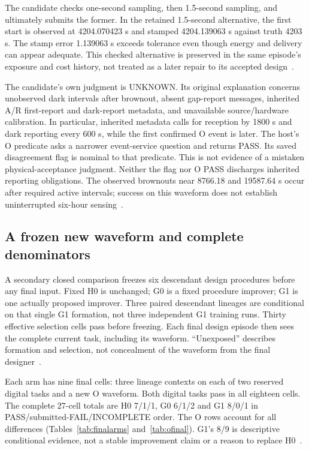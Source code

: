 

The candidate checks one-second sampling, then 1.5-second sampling,
and ultimately submits the former. In the retained 1.5-second
alternative, the first start is observed at 4204.070423 s and stamped
4204.139063 s against truth 4203 s. The stamp error 1.139063 s
exceeds tolerance even though energy and delivery can appear
adequate. This checked alternative is preserved in the same episode's
exposure and cost history, not treated as a later repair to its
accepted design~\cite{o0}.

The candidate's own judgment is UNKNOWN. Its original explanation
concerns unobserved dark intervals after brownout, absent gap-report
messages, inherited A/R first-report and dark-report metadata, and
unavailable source/hardware calibration. In particular, inherited
metadata calls for reception by 1800 s and dark reporting every
600 s, while the first confirmed O event is later. The host's O
predicate asks a narrower event-service question and returns PASS.
Its saved disagreement flag is nominal to that predicate. This is
not evidence of a mistaken physical-acceptance judgment. Neither
the flag nor O PASS discharges inherited reporting obligations.
The observed brownouts near 8766.18 and 19587.64 s occur after
required active intervals; success on this waveform does not
establish uninterrupted six-hour sensing~\cite{o0,otask}.

\subsection{A frozen new waveform and complete denominators}
A secondary closed comparison freezes six descendant design procedures
before any final input. Fixed H0 is unchanged; G0 is a fixed
procedure improver; G1 is one actually proposed improver. Three paired
descendant lineages are conditional on that single G1 formation,
not three independent G1 training runs. Thirty effective selection
cells pass before freezing. Each final design episode then sees the
complete current task, including its waveform. ``Unexposed'' describes
formation and selection, not concealment of the waveform from the
final designer~\cite{transfer}.

Each arm has nine final cells: three lineage contexts on each of
two reserved digital tasks and a new O waveform. Both digital tasks
pass in all eighteen cells. The complete 27-cell totals are H0
7/1/1, G0 6/1/2 and G1 8/0/1 in PASS/submitted-FAIL/INCOMPLETE
order. The O rows account for all differences
(Tables~\ref{tab:finalarms} and~\ref{tab:ofinal}). G1's 8/9 is
descriptive conditional evidence, not a stable improvement claim or
a reason to replace H0~\cite{final,preservation}.

